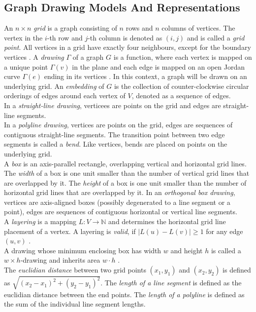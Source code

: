 \subsection{Graph Drawing Models And Representations}
An $n \times n$ \emph{grid} is a graph consisting of $n$ rows and $n$ columns of vertices. The vertex in the $i$-th row and $j$-th column is denoted as $(i,j)$ and is called a \emph{grid point}. All vertices in a grid have exactly four neighbours, except for the boundary vertices \cite[P. 760]{DBLP:cormen_intro_to_algorithms}.
A \emph{drawing} $\Gamma$ of a graph $G$ is a function, where each vertex is mapped on a unique point $\Gamma(v)$ in the plane and each edge is mapped on an open Jordan curve $\Gamma(e)$ ending in its vertices \cite[P. 225]{Duncan_planar_polyline_drawings}. In this context, a graph will be drawn on an underlying grid.
An \emph{embedding} of $G$ is the collection of counter-clockwise circular orderings of edges around each vertex of $V$, denoted as a sequence of edges.\\
In a \emph{straight-line drawing}, verticees are points on the grid and edges are straight-line segments.\\
In a \emph{polyline drawing}, vertices are points on the grid, edges are sequences of contiguous straight-line segments. The transition point between two edge segments is called a \emph{bend}. Like vertices, bends are placed on points on the underlying grid.\\
A \emph{box} is an axis-parallel rectangle, overlapping vertical and horizontal grid lines. The \emph{width} of a box is one unit smaller than the number of vertical grid lines that are overlapped by it. The \emph{height} of a box is one unit smaller than the number of horizontal grid lines that are overlapped by it.
In an \emph{orthogonal box drawing}, vertices are axis-aligned boxes (possibly degenerated to a line segment or a point), edges are sequences of contiguous horizontal or vertical line segments. \cite[P. 144ff]{Biedl_SP}\\
A \emph{layering} is a mapping $L: V \to \mathbb{N}$ and determines the horizontal grid line placement of a vertex. A layering is \emph{valid}, if $|L(u) - L(v)| \geq 1$ for any edge $(u,v)$ \cite[P. 4]{Ruegg_Layering}.\\
A drawing whose minimum enclosing box has width $w$ and height $h$ is called a $w\times h$-drawing and inherits area $w\cdot h$ \cite[P. 145]{Biedl_SP}.\\
The \emph{euclidian distance} between two grid points $(x_1,y_1)$ and $(x_2,y_2)$ is defined as $\sqrt{(x_2-x_1)^2 + (y_2-y_1)^2}$.
The \emph{length of a line segment} is defined as the euclidian distance between the end points. The \emph{length of a polyline} is defined as the sum of the individual line segment lengths.


